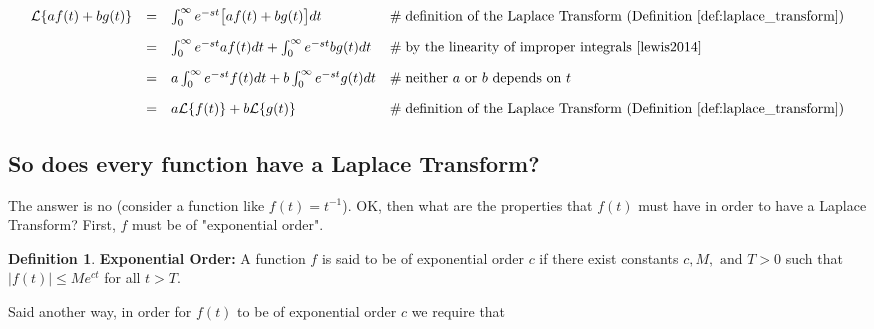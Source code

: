 \documentclass{article}
\theoremstyle{definition}
\newtheorem{definition}{Definition}[section]
\begin{document}
\smallskip
\begin{equation*}
\begin{array}{lllll}
\mathcal{L}\{af(t) + bg(t)\} 
&=& \int_0^\infty e^{-st} \big [af (t) + bg(t) \big] dt                                & \mathrel{\#} \text{definition of the Laplace Transform (Definition \ref{def:laplace_transform})}                               \\  
[10pt]                                                                                                   %
&=& \int_0^\infty e^{-st} af (t)  dt + \int_0^\infty e^{-st}  bg(t)  dt          & \mathrel{\#} \text{by the linearity of improper integrals \cite{lewis2014}}                                                                 \\
[10pt]                                                                                                   %
&=& a \int_0^\infty e^{-st}  f(t) dt + b \int_0^\infty e^{-st}  g(t) dt          & \mathrel{\#} \text{neither $a$ or $b$ depends on $t$}                                                                                            \\
[10pt]                                                                                                   %
&=& a \mathcal{L}\{f(t)\}  + b \mathcal{L}\{g(t)\}                                   & \mathrel{\#} \text{definition of the Laplace Transform (Definition \ref{def:laplace_transform})}
\end{array}
\end{equation*}



\smallskip
\subsection{So does every function have a Laplace Transform?}
The answer is no (consider a function like $f(t) = t^{-1}$). OK, then what are the properties that $f(t)$ must have in order to have a Laplace Transform? First, $f$ must
be of "exponential order". 


\bigskip
\begin{definition} 
{\bf Exponential Order:} A function $f$ is said to be of exponential order $c$ if there exist constants $c, M, \text{ and } T > 0$ such that $|f(t)| \leq Me^{ct}$ for all $t > T$.
\label{def:exponential_order}
\end{definition}

\bigskip
\noindent
Said another way, in order for $f(t)$ to be of exponential order $c$ we require that  
\end{document}
